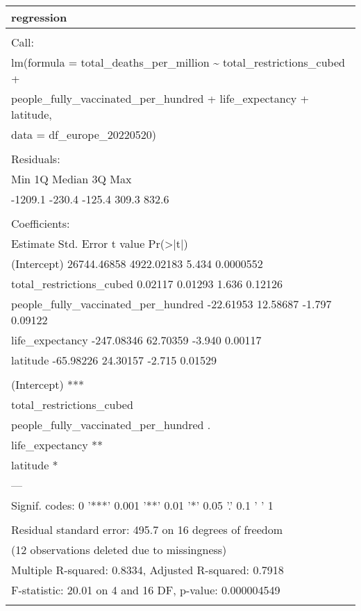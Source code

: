 \documentclass[
]{article}
\begin{document}
\begin{table}
\centering
\begin{tabular}[t]{l}
\hline
regression\\
\hline
\\
\hline
Call:\\
\hline
lm(formula = total\_deaths\_per\_million \textasciitilde{} total\_restrictions\_cubed +\\
\hline
people\_fully\_vaccinated\_per\_hundred + life\_expectancy + latitude,\\
\hline
data = df\_europe\_20220520)\\
\hline
\\
\hline
Residuals:\\
\hline
Min      1Q  Median      3Q     Max\\
\hline
-1209.1  -230.4  -125.4   309.3   832.6\\
\hline
\\
\hline
Coefficients:\\
\hline
Estimate  Std. Error t value  Pr(>|t|)\\
\hline
(Intercept)                         26744.46858  4922.02183   5.434 0.0000552\\
\hline
total\_restrictions\_cubed                0.02117     0.01293   1.636   0.12126\\
\hline
people\_fully\_vaccinated\_per\_hundred   -22.61953    12.58687  -1.797   0.09122\\
\hline
life\_expectancy                      -247.08346    62.70359  -3.940   0.00117\\
\hline
latitude                              -65.98226    24.30157  -2.715   0.01529\\
\hline
\\
\hline
(Intercept)                         ***\\
\hline
total\_restrictions\_cubed\\
\hline
people\_fully\_vaccinated\_per\_hundred .\\
\hline
life\_expectancy                     **\\
\hline
latitude                            *\\
\hline
---\\
\hline
Signif. codes:  0 '***' 0.001 '**' 0.01 '*' 0.05 '.' 0.1 ' ' 1\\
\hline
\\
\hline
Residual standard error: 495.7 on 16 degrees of freedom\\
\hline
(12 observations deleted due to missingness)\\
\hline
Multiple R-squared:  0.8334,    Adjusted R-squared:  0.7918\\
\hline
F-statistic: 20.01 on 4 and 16 DF,  p-value: 0.000004549\\
\hline
\\
\hline
\end{tabular}
\end{table}
\end{document}
